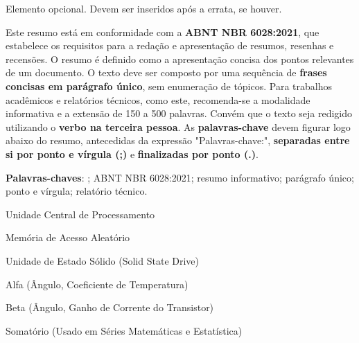 \documentclass{Arquivos/AcademicoPadrao}
\begin{document}
\nocite{*}


\pretextual %


\folhaderosto
\contracapa


Elemento opcional. Devem ser inseridos após a errata, se houver.




\begin{resumo}
Este resumo está em conformidade com a \textbf{ABNT NBR 6028:2021}, que estabelece os requisitos para a redação e apresentação de resumos, resenhas e recensões. O resumo é definido como a apresentação concisa dos pontos relevantes de um documento. O texto deve ser composto por uma sequência de \textbf{frases concisas em parágrafo único}, sem enumeração de tópicos. Para trabalhos acadêmicos e relatórios técnicos, como este, recomenda-se a modalidade informativa e a extensão de 150 a 500 palavras. Convém que o texto seja redigido utilizando o \textbf{verbo na terceira pessoa}. As \textbf{palavras-chave} devem figurar logo abaixo do resumo, antecedidas da expressão "Palavras-chave:", \textbf{separadas entre si por ponto e vírgula (;)} e \textbf{finalizadas por ponto (.)}.

\textbf{Palavras-chaves}: \WenesTex; ABNT NBR 6028:2021; resumo informativo; parágrafo único; ponto e vírgula; relatório técnico.
\end{resumo}


\begin{resumoEN}

\end{resumoEN}


\listaDeFiguras
\listaDeTabelas


\begin{siglas}
    \item[CPU] Unidade Central de Processamento
    \item[RAM] Memória de Acesso Aleatório
    \item[SSD] Unidade de Estado Sólido (Solid State Drive)
\end{siglas}


\begin{simbolos}
    \item[$\alpha$] Alfa (Ângulo, Coeficiente de Temperatura)
    \item[$\beta$] Beta (Ângulo, Ganho de Corrente do Transistor)
    \item[$\sum$] Somatório (Usado em Séries Matemáticas e Estatística)
\end{simbolos}
\end{document}
